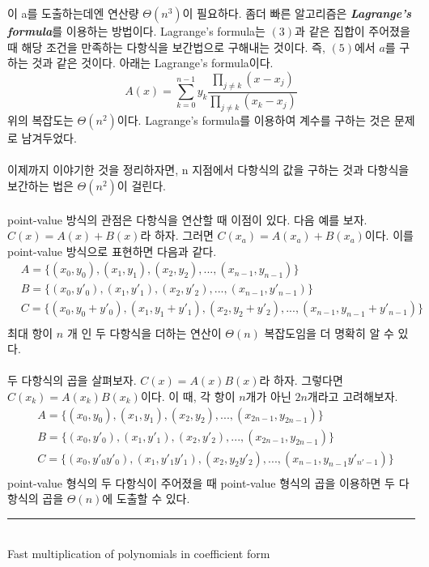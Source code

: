 \documentclass{article}
\begin{document}
이 a를 도출하는데엔 연산량 $\Theta (n^3)$이 필요하다. 
좀더 빠른 알고리즘은 \textit{\textbf{Lagrange's formula}}를 이용하는 방법이다. 
Lagrange's formula는 $(3)$과 같은 집합이 주어졌을 때 해당 조건을 만족하는 다항식을 보간법으로 구해내는 것이다. 
즉, $(5)$에서 $a$를 구하는 것과 같은 것이다. 아래는 Lagrange's formula이다. 
$$
A(x) = \sum_{k=0}^{n-1}y_k\frac{\prod_{j \ne k}(x - x_j)}{\prod_{j \ne k }(x_k - x_j)}
$$
위의 복잡도는 $\Theta (n^2)$이다. Lagrange's formula를 이용하여 계수를 구하는 것은 문제로 남겨두었다.
\\\\
이제까지 이야기한 것을 정리하자면, n 지점에서 다항식의 값을 구하는 것과 다항식을 보간하는 법은 $\Theta (n^2)$이 걸린다. 
\\\\
point-value 방식의 관점은 다항식을 연산할 때 이점이 있다. 다음 예를 보자. $C(x)  = A(x) + B(x)$라 하자. 그러면 $C(x_a) = A(x_a) + B(x_a)$이다. 
이를 point-value 방식으로 표현하면 다음과 같다.
\begin{align*}
&A = \{(x_0, y_0), (x_1, y_1), (x_2, y_2), ... , (x_{n-1}, y_{n-1})\}\\
&B = \{(x_0, y'_0), (x_1, y'_1), (x_2, y'_2), ... , (x_{n-1}, y'_{n-1})\}\\
&C = \{(x_0, y_0+y'_0), (x_1, y_1+y'_1), (x_2, y_2+y'_2), ... , (x_{n-1}, y_{n-1}+y'_{n-1})\}\\
\end{align*}
최대 항이 $n$ 개 인 두 다항식을 더하는 연산이 $\Theta (n)$ 복잡도임을 더 명확히 알 수 있다.
\\\\
두 다항식의 곱을 살펴보자. $C(x)=A(x)B(x)$라 하자. 그렇다면 $C(x_k) =A(x_k)B(x_k)$이다. 이 때, 각 항이 $n$개가 아닌 $2n$개라고 고려해보자. 
\begin{align*}
&A = \{(x_0, y_0), (x_1, y_1), (x_2, y_2), ... , (x_{2n-1}, y_{2n-1})\}\\
&B = \{(x_0, y'_0), (x_1, y'_1), (x_2, y'_2), ... , (x_{2n-1}, y_{2n-1})\}\\
&C = \{(x_0, y'_0y'_0), (x_1, y'_1y'_1), (x_2, y_2y'_2), ... , (x_{n-1}, y_{n-1}y'_{n'-1})\}\\
\end{align*}
point-value 형식의 두 다항식이 주어졌을 때 point-value 형식의 곱을 이용하면 두 다항식의 곱을 $\Theta (n)$에 도출할 수 있다. 
\\
\noindent\rule{10cm}{1pt}
\\
\Large
Fast multiplication of polynomials in coefficient form
\vspace{5mm}
\end{document}

